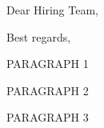 \documentclass[11pt,a4paper,sans]{moderncv}
\begin{document}
\date{\today}
\opening{Dear Hiring Team,}
\closing{Best regards,}
\makelettertitle

PARAGRAPH 1

PARAGRAPH 2

PARAGRAPH 3

\makeletterclosing
\end{document}
